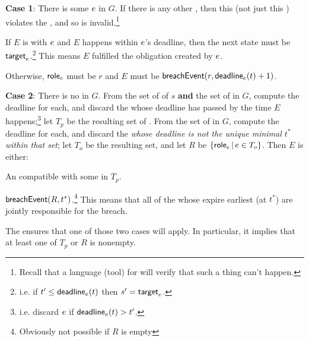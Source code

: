 \documentclass[12pt]{article}
\begin{document}
{\bf Case 1}: There is some \enabled \mustntran $e$ in $G$. If there is any other \enabled \transition, then this \Contract (not just this \trace) violates the \uaoc, and so is invalid.\footnote{Recall that a language (tool) for \FSContracts will verify that such a thing can't happen.}
\begin{PPI}
    \item If $E$ is \compatible with $e$ and $E$ happens within $e$'s deadline, then the next state must be $\textsf{target}_{e}$.\footnote{i.e. if $t' \leq \textsf{deadline}_{e}(t)$ then $s' = \textsf{target}_{e}$.} This means $E$ fulfilled the obligation created by $e$.
        \item Otherwise, $\textsf{role}_{e}$ must be $r$ and $E$ must be $\textsf{breachEvent}(r,\textsf{deadline}_{e}(t) + 1)$. %
\end{PPI}

{\bf Case 2}: There is no \enabled \mustntran in $G$. From the set of \enabled \mayntrans of $s$ {\bf and} the set of \enabled \rmustntrans in $G$, compute the deadline for each, and discard the \transitions whose deadline has passed by the time $E$ happens;\footnote{i.e. discard $e$ if $\textsf{deadline}_{e}(t) > t'$.}  let $T_p$ be the resulting set of \transitions. From the set of \enabled \rmustntrans in $G$, compute the deadline for each, and discard the {\transitions} {\it whose deadline is not the unique minimal \TimeStamp $t^*$ within that set}; let $T_o$ be the resulting set, and let $R$ be $\{ \textsf{role}_{e} \, \vert \, e \in T_{o} \}$. Then $E$ is either:
\begin{PPI}
	\item An \Event compatible with some \transition in $T_p$.
	\item $\textsf{breachEvent}(R,t^*)$.\footnote{Obviously not possible if $R$ is empty} This means that all of the \Roles whose \enabled \rmustntran expire earliest (at $t^*$) are jointly responsible for the breach.
\end{PPI}
The \bostgc ensures that one of those two cases will apply. In particular, it implies that at least one of $T_p$ or $R$ is nonempty.

\end{document}
